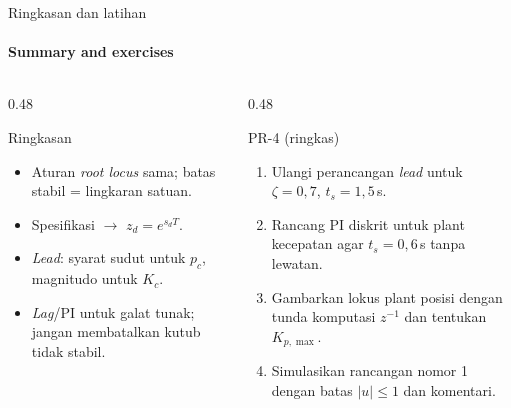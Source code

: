 \documentclass[aspectratio=169,10pt]{beamer}
\begin{document}
\begin{frame}{Ringkasan dan latihan}
	\framesubtitle{Summary and exercises}
	\begin{columns}[T]
		\begin{column}{0.48\textwidth}
			\begin{block}{Ringkasan}
				\small
				\begin{itemize}
					\item Aturan \textit{root locus} sama; batas stabil = lingkaran satuan.
					\item Spesifikasi $\rightarrow$ $z_d = e^{s_dT}$.
					\item \textit{Lead}: syarat sudut untuk $p_c$, magnitudo untuk $K_c$.
					\item \textit{Lag}/PI untuk galat tunak; jangan membatalkan kutub tidak stabil.
				\end{itemize}
			\end{block}
		\end{column}
		\begin{column}{0.48\textwidth}
			\begin{exampleblock}{PR-4 (ringkas)}
				\small
				\begin{enumerate}
					\item Ulangi perancangan \textit{lead} untuk $\zeta = 0{,}7$, $t_s = 1{,}5$\,s.
					\item Rancang PI diskrit untuk plant kecepatan agar $t_s = 0{,}6$\,s tanpa lewatan.
					\item Gambarkan lokus plant posisi dengan tunda komputasi $z^{-1}$ dan tentukan $K_{p,\max}$.
					\item Simulasikan rancangan nomor 1 dengan batas $|u| \le 1$ dan komentari.
				\end{enumerate}
			\end{exampleblock}
		\end{column}
	\end{columns}
\end{frame}
\end{document}
